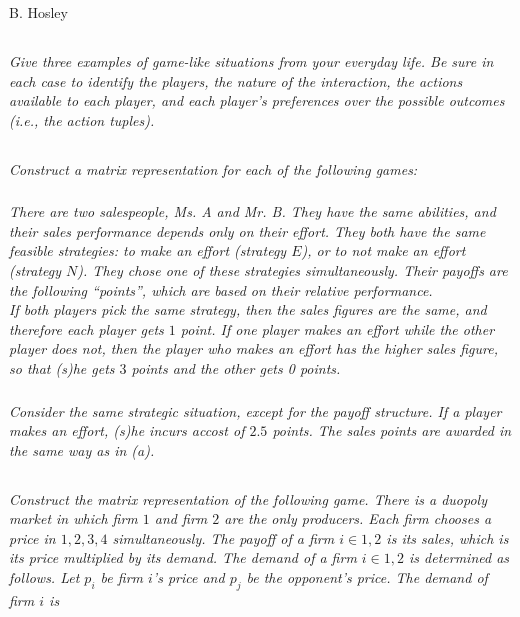 \documentclass[12pt]{amsart}
\begin{document}
\raggedbottom

\hspace{\fill} {\large B. Hosley}
\bigskip


\subsection{}
\emph{ Give three examples of game-like situations from your everyday life. Be sure in each case to
	identify the players, the nature of the interaction, the actions available to each player, and
	each player’s preferences over the possible outcomes (i.e., the action tuples).}

\subsection{}
\emph{Construct a matrix representation for each of the following games:}

\subsubsection{}
\emph{There are two salespeople, Ms. A and Mr. B. They have the same abilities, and their
	sales performance depends only on their effort. They both have the same feasible
	strategies: to make an effort (strategy $E$), or to not make an effort (strategy $N$). They
	chose one of these strategies simultaneously. Their payoffs are the following “points”,
	which are based on their relative performance. \\
	If both players pick the same strategy, then the sales figures are the same, and
	therefore each player gets $1$ point. If one player makes an effort while the other player
	does not, then the player who makes an effort has the higher sales figure, so that (s)he
	gets $3$ points and the other gets 0 points.}
	
\subsubsection{}
\emph{Consider the same strategic situation, except for the payoff structure. If a player makes
	an effort, (s)he incurs accost of $2.5$ points. The sales points are awarded in the same
	way as in (a).}

\subsection{}
\emph{Construct the matrix representation of the following game.
There is a duopoly market in which firm $1$ and firm $2$ are the only producers. Each firm
chooses a price in ${1, 2,3,4}$ simultaneously. The payoff of a firm $i\in {1,2}$ is its sales, which
is its price multiplied by its demand. The demand of a firm $i \in {1,2}$ is determined as
follows. Let $p_i$ be firm $i$’s price and $p_j$ be the opponent’s price. The demand of firm $i$ is}
\end{document}
